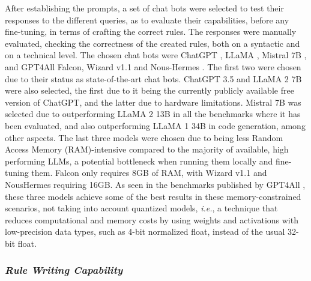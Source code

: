 \documentclass[sigconf]{acmart}
\begin{document}
After establishing the prompts, a set of chat bots were selected to test their responses to the different
queries, as to evaluate their capabilities, before any fine-tuning, in
terms of crafting the correct rules. The responses were manually
evaluated, checking the correctness of the created rules, both on a
syntactic and on a technical level.
The chosen chat bots were ChatGPT \cite{OpenAI22}, LLaMA \cite{Meta23}, Mistral
7B  \cite{Jiang23}, and GPT4All Falcon, Wizard v1.1 and Nous-Hermes  \cite{Anand23}. The first two were chosen due to their status as state-of-the-art chat
bots. ChatGPT 3.5 and LLaMA 2 7B were also selected, the first due
to it being the currently publicly available free version of ChatGPT,
and the latter due to hardware limitations. Mistral 7B was selected
due to outperforming LLaMA 2 13B in all the benchmarks where
it has been evaluated, and also outperforming LLaMA 1 34B in
code generation, among other aspects. The last three models were chosen due to being less Random Access Memory (RAM)-intensive
compared to the majority of available, high performing LLMs, a
potential bottleneck when running them locally and fine-tuning
them. Falcon only requires 8GB of RAM, with Wizard v1.1 and NousHermes requiring 16GB. As seen in the benchmarks published by
GPT4All \cite{Anand23}, these three models achieve some of the best results
in these memory-constrained scenarios, not taking into account
quantized models, {\itshape i.e.}, a technique that reduces computational and
memory costs by using weights and activations with low-precision
data types, such as 4-bit normalized float, instead of the usual 32-bit
float.

\subsubsection{{\itshape Rule Writing Capability}}
\end{document}
